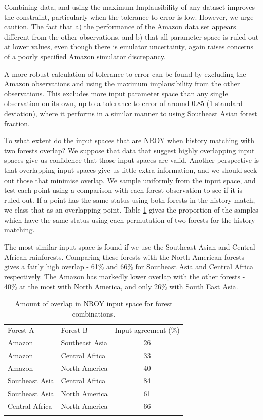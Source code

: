 \documentclass[esd, manuscript]{copernicus}
\begin{document}
Combining data, and using the maximum Implausibility of any dataset improves the constraint, particularly when the tolerance to error is low. However, we urge caution. The fact that a) the performance of the Amazon data set appears different from the other observations, and b) that all parameter space is ruled out at lower values, even though there is emulator uncertainty, again raises concerns of a poorly specified Amazon simulator discrepancy. 

A more robust calculation of tolerance to error can be found by excluding the Amazon observations and using the maximum implausibility from the other observations. This excludes more input parameter space than any single observation on its own, up to a tolerance to error of around 0.85 (1 standard deviation), where it performs in a similar manner to using Southeast Asian forest fraction.
 

To what extent do the input spaces that are NROY when history matching with two forests overlap? We suppose that data that suggest highly overlapping input spaces give us confidence that those input spaces are valid. Another perspective is that overlapping input spaces give us little extra information, and we should seek out those that minimise overlap. We sample uniformly from the input space, and test each point using a comparison with each forest observation to see if it is ruled out. If a point has the same status using both forests in the history match, we class that as an overlapping point. Table \ref{tab:input_overlap} gives the proportion of the samples which have the same status using each permutation of two forests for the history matching.

The most similar input space is found if we use the Southeast Asian and Central African rainforests. Comparing these forests with the North American forests gives a fairly high overlap - 61\% and 66\% for Southeast Asia and Central Africa respectively. The Amazon has markedly lower overlap with the other forests - 40\% at the most with North America, and only 26\% with South East Asia.


\begin{table}[t]
\caption{Amount of overlap in NROY input space for forest combinations.}\label{tab:input_overlap}
\begin{tabular}{llc}

\tophline
Forest A &  Forest B & Input agreement (\%) \\
Amazon & Southeast Asia & 26 \\
Amazon & Central Africa & 33 \\
Amazon & North America & 40 \\
Southeast Asia & Central Africa & 84 \\
Southeast Asia & North America & 61 \\
Central Africa  & North America & 66 \\
\bottomhline
\end{tabular}
\belowtable{} %
\end{table}
\end{document}
